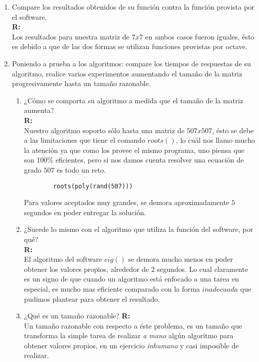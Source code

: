 \begin{enumerate}
	\item Compare los resultados obtenidos de su función contra la
	función provista por el software.\\
	\textbf{R:}\\
	Los resultados para nuestra matriz de $7x7$
	en ambos casos fueron iguales,
	ésto es debido a que de las dos formas se utilizan funciones provistas por octave.\\


	\item Poniendo a prueba a los algoritmos: compare los tiempos de respuestas de su algoritmo,
		realice varios experimentos aumentando el tamaño de la matriz progresivamente hasta un
		tamaño razonable.
	\begin{enumerate}
 		\item ¿Cómo se comporta su algoritmo a medida que el tamaño de la matriz aumenta?\\
		\textbf{R:}\\
		Nuestro algoritmo soporto sólo hasta una matriz de $507x507$,
		ésto se debe a las limitaciones que tiene el comando $roots()$,
		lo cuál nos llamo mucho la atención ya que como los provee el mismo programa,
		uno piensa que son 100\% eficientes, pero si nos damos cuenta
		resolver una ecuación de grado $507$ es todo un reto.
		\begin{verbatim}
		roots(poly(rand(507)))
		\end{verbatim}
		Para valores aceptados muy grandes,
		se demora aproximadamente $5$ segundos en poder entregar la solución.

		\item ¿Sucede lo mismo con el algoritmo que utiliza la función del software, por qué?\\
		\textbf{R:}\\
		El algoritmo del software $eig()$ se demora mucho menos en poder obtener los
		valores propios, alrededor de $2$ segundos.
		Lo cual claramente es un signo de que cuando un algoritmo está enfocado a una tarea
		en especial, es mucho mas eficiente comparado con la forma $inadecuada$ que pudimos
		plantear para obtener el resultado.

		\item ¿Qué es un tamaño razonable?
		\textbf{R:}\\
		Un tamaño razonable con respecto a éste problema,
		es un tamaño que transforma la simple tarea de realizar
		\emph{a mano} algún algoritmo para obtener valores propios,
		en un ejercicio \emph{inhumano} y casi imposible de realizar.


\end{enumerate}
\end{enumerate}
